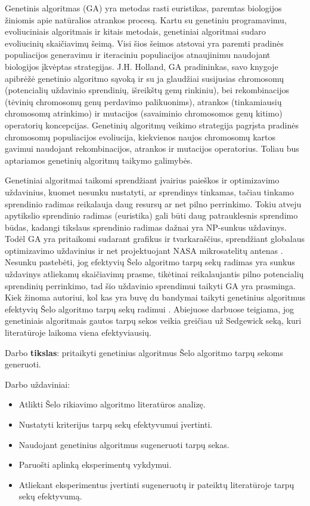 \documentclass{VUMIFInfKursinis}
\begin{document}
Genetinis algoritmas (GA) yra metodas rasti euristikas, paremtas biologijos žiniomis apie natūralios atrankos procesą.
Kartu su genetiniu programavimu, evoliuciniais algoritmais ir kitais metodais, %
genetiniai algoritmai sudaro evoliucinių skaičiavimų šeimą.
Visi šios šeimos atstovai yra paremti pradinės populiacijos generavimu ir iteraciniu populiacijos atnaujinimu naudojant biologijos įkvėptas strategijas.
J.H. Holland, GA pradininkas, savo knygoje \cite{holland1992adaptation}
apibrėžė genetinio algoritmo sąvoką ir su ja glaudžiai susijusias
chromosomų (potencialių uždavinio sprendinių, išreikštų genų rinkiniu), bei
rekombinacijos (tėvinių chromosomų genų perdavimo palikuonims),
atrankos (tinkamiausių chromosomų atrinkimo) ir mutacijos (savaiminio chromosomos genų kitimo) operatorių koncepcijas.
Genetinių algoritmų veikimo strategija pagrįsta pradinės chromosomų populiacijos evoliucija, kiekvienos naujos chromosomų kartos
gavimui naudojant rekombinacijos, atrankos ir mutacijos operatorius.
Toliau bus aptariamos genetinių algoritmų taikymo galimybės.

Genetiniai algoritmai taikomi sprendžiant įvairius paieškos ir optimizavimo uždavinius, kuomet nesunku nustatyti, ar sprendinys tinkamas,
tačiau tinkamo sprendinio radimas reikalauja daug resursų ar net pilno perrinkimo.
Tokiu atveju apytikslio sprendinio radimas (euristika) gali būti daug patrauklesnis sprendimo būdas,
kadangi tikslaus sprendinio radimas dažnai yra NP-sunkus uždavinys.
Todėl GA yra pritaikomi sudarant grafikus ir tvarkaraščius,
sprendžiant globalaus optimizavimo uždavinius
ir net projektuojant NASA mikrosatelitų antenas \cite{hornby2006automated}.
Nesunku pastebėti, jog efektyvių Šelo algoritmo tarpų sekų radimas yra sunkus uždavinys atliekamų skaičiavimų prasme,
tikėtinai reikalaujantis pilno potencialių sprendinių perrinkimo,
tad šio uždavinio sprendimui taikyti GA yra prasminga.
Kiek žinoma autoriui, kol kas yra buvę du bandymai taikyti genetinius algoritmus efektyvių Šelo algoritmo tarpų sekų radimui \cite{simpson1999faster, roos2002genetic}.
Abiejuose darbuose teigiama, jog genetiniais algoritmais gautos tarpų sekos veikia greičiau už Sedgewick seką, kuri literatūroje laikoma viena efektyviausių.

\pagebreak

Darbo \textbf{tikslas}:
pritaikyti genetinius algoritmus Šelo algoritmo tarpų sekoms generuoti.

Darbo uždaviniai:
\begin{itemize}
  \item Atlikti Šelo rikiavimo algoritmo literatūros analizę.
  \item Nustatyti kriterijus tarpų sekų efektyvumui įvertinti.
  \item Naudojant genetinius algoritmus sugeneruoti tarpų sekas.
  \item Paruošti aplinką eksperimentų vykdymui.
  \item Atliekant eksperimentus įvertinti sugeneruotų ir pateiktų literatūroje tarpų sekų efektyvumą.
\end{itemize}
\end{document}
